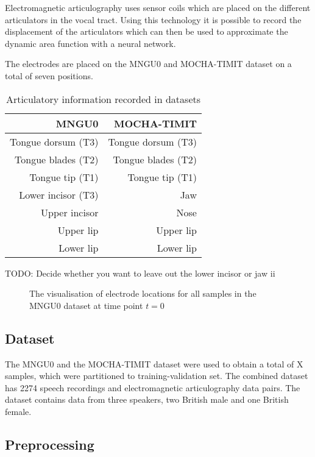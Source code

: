 \documentclass[a4paper]{article}
\begin{document}
Electromagnetic articulography uses sensor coils which are placed on the
different articulators in the vocal tract. Using this technology it
is possible to record the displacement of the articulators which can then
be used to approximate the dynamic area function with a neural network.

The electrodes are placed on the MNGU0 and MOCHA-TIMIT dataset on a total
of seven positions.
\begin{table}[th]
  \caption{Articulatory information recorded in datasets}
  \label{tab:example}
  \centering
  \begin{tabular}{ r r }
    \toprule
    \textbf{MNGU0} & \textbf{MOCHA-TIMIT} \\
    \midrule
    Tongue dorsum (T3) & Tongue dorsum (T3) \\
    Tongue blades (T2) & Tongue blades (T2) \\
    Tongue tip (T1) & Tongue tip (T1) \\
    Lower incisor (T3) & Jaw \\
    Upper incisor & Nose \\
    Upper lip & Upper lip \\
    Lower lip & Lower lip \\
    \bottomrule
  \end{tabular}
  
\end{table}

TODO: Decide whether you want to leave out the lower incisor or jaw
ii
\begin{figure}[t]
  \begin{center}
    \scalebox{0.50}{}
  \caption{The visualisation of electrode locations for all samples in
    the MNGU0 dataset at time point \( t = 0 \)}
\end{center}
\end{figure}
\subsection{Dataset}

The MNGU0 and the MOCHA-TIMIT dataset were used to obtain a total of
X samples, which were partitioned to training-validation set. The
combined dataset has 2274 speech recordings and electromagnetic articulography
data pairs. The dataset contains data from three speakers, two British
male and one British female.

\subsection{Preprocessing}
\end{document}
